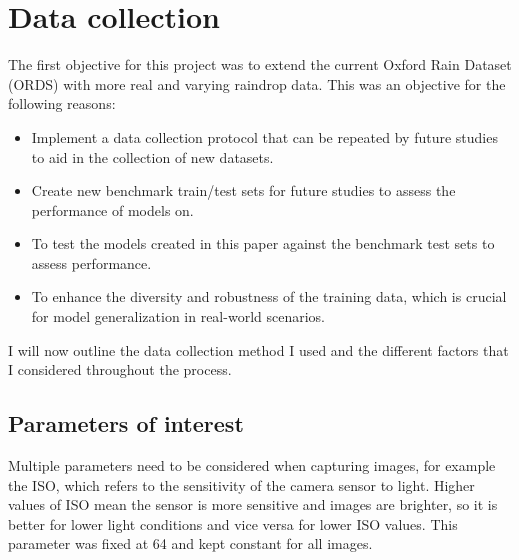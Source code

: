 \documentclass[11pt]{ociamthesis}  %
\begin{document}
\section{Data collection}

The first objective for this project was to extend the current Oxford Rain Dataset (ORDS) with more real and varying raindrop data. This was an objective for the following reasons:

\begin{itemize}
    \item Implement a data collection protocol that can be repeated by future studies to aid in the collection of new datasets.
    \item Create new benchmark train/test sets for future studies to assess the performance of models on.
    \item To test the models created in this paper against the benchmark test sets to assess performance.
    \item To enhance the diversity and robustness of the training data, which is crucial for model generalization in real-world scenarios.
\end{itemize}

I will now outline the data collection method I used and the different factors that I considered throughout the process.

\subsection{Parameters of interest}

Multiple parameters need to be considered when capturing images, for example the ISO, which refers to the sensitivity of the camera sensor to light. Higher values of ISO mean the sensor is more sensitive and images are brighter, so it is better for lower light conditions and vice versa for lower ISO values. This parameter was fixed at 64 and kept constant for all images.
\end{document}

